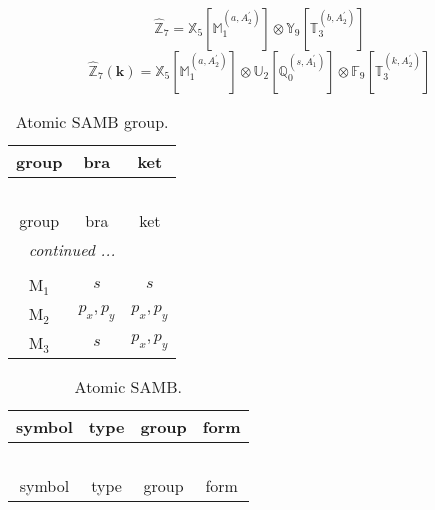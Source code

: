 \documentclass[fleqn,10pt,landscape]{article}
\begin{document}
\begin{itemize}
\begin{dmath*}
\hat{\mathbb{Z}}_{7}=\mathbb{X}_{5}[\mathbb{M}_{1}^{(a,A_{2}^{\prime})}] \otimes\mathbb{Y}_{9}[\mathbb{T}_{3}^{(b,A_{2}^{\prime})}]
\end{dmath*}
\begin{dmath*}
\hat{\mathbb{Z}}_{7}(\bm{k})=\mathbb{X}_{5}[\mathbb{M}_{1}^{(a,A_{2}^{\prime})}] \otimes\mathbb{U}_{2}[\mathbb{Q}_{0}^{(s,A_{1}^{\prime})}] \otimes\mathbb{F}_{9}[\mathbb{T}_{3}^{(k,A_{2}^{\prime})}]
\end{dmath*}
\begin{center}
\renewcommand{\arraystretch}{1.3}
\begin{longtable}{c|c|c}
\caption{Atomic SAMB group.}
 \\
 \hline \hline
group & bra & ket \\ \hline \endfirsthead

\multicolumn{2}{l}{\tablename\ \thetable{}} \\
 \hline \hline
group & bra & ket \\ \hline \endhead

 \hline \hline
\multicolumn{2}{r}{\footnotesize\it continued ...} \\ \endfoot

 \hline \hline
\multicolumn{2}{r}{} \\ \endlastfoot

M$_{1}$ & $s$ & $s$ \\
M$_{2}$ & $p_{x}, p_{y}$ & $p_{x}, p_{y}$ \\
M$_{3}$ & $s$ & $p_{x}, p_{y}$ \\
\end{longtable}
\end{center}
\begin{center}
\renewcommand{\arraystretch}{1.3}
\begin{longtable}{c|c|c|c}
\caption{Atomic SAMB.}
 \\
 \hline \hline
symbol & type & group & form \\ \hline \endfirsthead

\multicolumn{3}{l}{\tablename\ \thetable{}} \\
 \hline \hline
symbol & type & group & form \\ \hline \endhead


\end{longtable}
\end{center}
\end{itemize}
\end{document}
